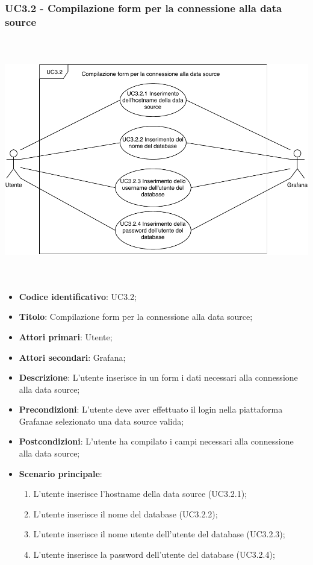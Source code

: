     \subsubsection{UC3.2 - Compilazione form per la connessione alla data source}
    \hspace*{-0.5cm}\includegraphics[width=400pt, height=300pt]{img/uc3_2.pdf}
        \begin{itemize}
            \item \textbf{Codice identificativo}: UC3.2;
            \item \textbf{Titolo}: Compilazione form per la connessione alla data source;
            \item \textbf{Attori primari}: Utente;
            \item \textbf{Attori secondari}: Grafana\glo;
            \item \textbf{Descrizione}: L'utente inserisce in un form i dati necessari alla connessione alla data source;
            \item \textbf{Precondizioni}: L'utente deve aver effettuato il login nella piattaforma Grafana\glosp e selezionato una data source valida;
            \item \textbf{Postcondizioni}: L'utente ha compilato i campi necessari alla connessione alla data source;
            \item \textbf{Scenario principale}:
            \begin{enumerate}
                \item L'utente inserisce l'hostname della data source (UC3.2.1);
                \item L'utente inserisce il nome del database (UC3.2.2);
                \item L'utente inserisce il nome utente dell'utente del database (UC3.2.3);
                \item L'utente inserisce la password dell'utente del database (UC3.2.4);
            \end{enumerate}
        \end{itemize}

